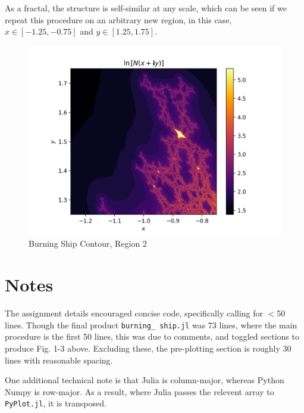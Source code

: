 \documentclass[10pt, reqno]{amsart}
\begin{document}
\begin{multicols}{2}
As a fractal, the structure is self-similar at any scale, which can be seen if we repeat this procedure on an arbitrary new region, in this case, $x \in [-1.25, -0.75]$ and $y \in [1.25, 1.75]$. 
\begin{figure}[H]
    \centering
    \includegraphics[width=1\linewidth]{burning_ship_zoom.png}
    \caption{Burning Ship Contour, Region 2}
    \label{fig:3}
\end{figure}

\section{Notes}
The assignment details encouraged concise code, specifically calling for $<$50 lines. Though the final product \texttt{burning\_ ship.jl} was 73 lines, where the main procedure is the first 50 lines, this was due to comments, and toggled sections to produce Fig. 1-3 above. Excluding these, the pre-plotting section is roughly 30 lines with reasonable spacing. 

One additional technical note is that Julia is column-major, whereas Python Numpy is row-major. As a result, where Julia passes the relevent array to \texttt{PyPlot.jl}, it is transposed.

\end{multicols}
\end{document}
